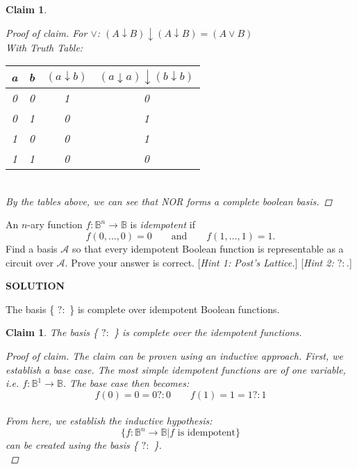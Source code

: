 \documentclass{exam} %
\newcommand{\m}[1]{\mathbb{#1}}    %
\newcommand{\cl}[1]{\mathcal{#1}}  %
\theoremstyle{plain}
\newtheorem{claim}[thm]{Claim}      \newtheorem*{claim*}{Claim}
\theoremstyle{definition}
\theoremstyle{remark}
\newenvironment{claimproof} {
  \begin{proof}[Proof of claim]
  \renewcommand{\qedsymbol}{\ensuremath{\bullet}}
  } {
  \end{proof}
  }
\numberwithin{equation}{section}  %
\newcommand{\sol}{\begin{center}\textbf{SOLUTION}\end{center}}
\begin{document}
\begin{questions}
\begin{claim}
\begin{claimproof}
      For $\lor$: $(A \downarrow B) \downarrow (A \downarrow B) = (A \lor B)$\\ 
      With Truth Table:\\
      \begin{tabular}{cc|c|c}
        a & b & $(a \downarrow b)$ & $(a \downarrow a) \downarrow 
        (b \downarrow b)$\\
        \hline
        0 & 0 & 1 & 0 \\
        0 & 1 & 0 & 1 \\
        1 & 0 & 0 & 1 \\
        1 & 1 & 0 & 0 \\
      \end{tabular}\\
    By the tables above, we can see that NOR forms a complete boolean basis.
    \end{claimproof}
  \end{claim}
\question An $n$-ary function $f:\m{B}^n\to\m{B}$ is \emph{idempotent} if
\[
  f(0,\ldots,0) = 0
  \qquad\text{and}\qquad
  f(1,\ldots,1) = 1.
\]
Find a basis $\cl{A}$ so that every idempotent Boolean function is
representable as a circuit over $\cl{A}$. Prove your answer is correct.
[\emph{Hint 1: Post's Lattice.}] [\emph{Hint 2: $?:$.}]
\sol
The basis \{ $?:$ \} is complete over idempotent Boolean functions.\\

\begin{claim} The basis \{ $?:$ \} is complete over the idempotent functions.
  \begin{claimproof}
    The claim can be proven using an inductive approach. First, we establish
    a base case. The most simple idempotent functions are of one variable,
    i.e. $f:\m{B}^1\to\m{B}$. The base case then becomes:\\
    \[f(0) = 0 = 0 ?: 0 \qquad f(1) = 1 = 1 ?: 1\]\\
    From here, we establish the inductive hypothesis:
    \[
      \{f:\m{B}^n\to\m{B}|\text{$f$ is idempotent}\}
    \]
    can be created using the basis \{ $?:$ \}.\\


\end{claimproof}
\end{claim}
\end{questions}
\end{document}
